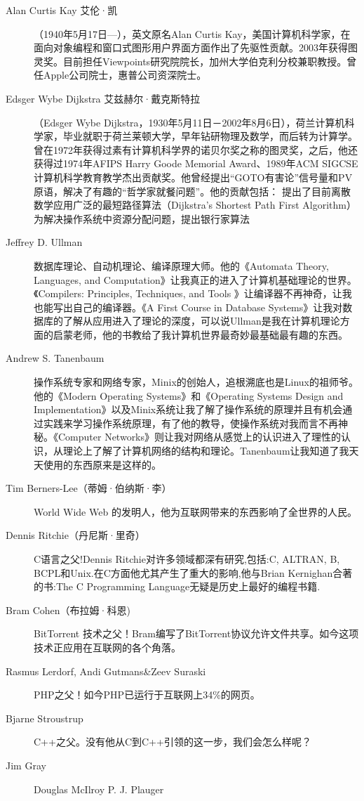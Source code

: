 \begin{description}
\item[Alan Curtis Kay 艾伦·凯]
（1940年5月17日—），英文原名Alan Curtis Kay，美国计算机科学家，在面向对象编程和窗口式图形用户界面方面作出了先驱性贡献。2003年获得图灵奖。目前担任Viewpoints研究院院长，加州大学伯克利分校兼职教授。曾任Apple公司院士，惠普公司资深院士。
\item[Edsger Wybe Dijkstra 艾兹赫尔·戴克斯特拉]
（Edsger Wybe Dijkstra，1930年5月11日－2002年8月6日），荷兰计算机科学家，毕业就职于荷兰莱顿大学，早年钻研物理及数学，而后转为计算学。曾在1972年获得过素有计算机科学界的诺贝尔奖之称的图灵奖，之后，他还获得过1974年AFIPS Harry Goode Memorial Award、1989年ACM SIGCSE计算机科学教育教学杰出贡献奖。他曾经提出“GOTO有害论”信号量和PV原语，解决了有趣的“哲学家就餐问题”。他的贡献包括：
提出了目前离散数学应用广泛的最短路径算法（Dijkstra's Shortest Path First Algorithm）
为解决操作系统中资源分配问题，提出银行家算法
\item[Jeffrey D. Ullman]
数据库理论、自动机理论、编译原理大师。他的《Automata Theory, Languages, and Computation》让我真正的进入了计算机基础理论的世界。《Compilers: Principles, Techniques, and Tools 》让编译器不再神奇，让我也能写出自己的编译器。《A First Course in Database Systems》让我对数据库的了解从应用进入了理论的深度，可以说Ullman是我在计算机理论方面的启蒙老师，他的书教给了我计算机世界最奇妙最基础最有趣的东西。
\item[Andrew S. Tanenbaum]
操作系统专家和网络专家，Minix的创始人，追根溯底也是Linux的祖师爷。他的《Modern Operating Systems》和《Operating Systems Design and Implementation》以及Minix系统让我了解了操作系统的原理并且有机会通过实践来学习操作系统原理，有了他的教导，使操作系统对我而言不再神秘。《Computer Networks》则让我对网络从感觉上的认识进入了理性的认识，从理论上了解了计算机网络的结构和理论。Tanenbaum让我知道了我天天使用的东西原来是这样的。

\item[Tim Berners-Lee（蒂姆·伯纳斯·李）]
 World Wide Web 的发明人，他为互联网带来的东西影响了全世界的人民。
\item[Dennis Ritchie（丹尼斯·里奇）]
C语言之父!Dennis Ritchie对许多领域都深有研究,包括:C, ALTRAN, B, BCPL和Unix.在C方面他尤其产生了重大的影响,他与Brian Kernighan合著的书:The C Programming Language无疑是历史上最好的编程书籍.
\item[Bram Cohen（布拉姆·科恩)]
BitTorrent 技术之父！Bram编写了BitTorrent协议允许文件共享。如今这项技术正应用在互联网的各个角落。
\item[Rasmus Lerdorf, Andi Gutmans\&Zeev Suraski]
PHP之父！如今PHP已运行于互联网上34\%的网页。
\item[Bjarne Stroustrup]
C++之父。没有他从C到C++引领的这一步，我们会怎么样呢？

\item[Jim Gray]



Douglas McIlroy
P. J. Plauger












\end{description}

